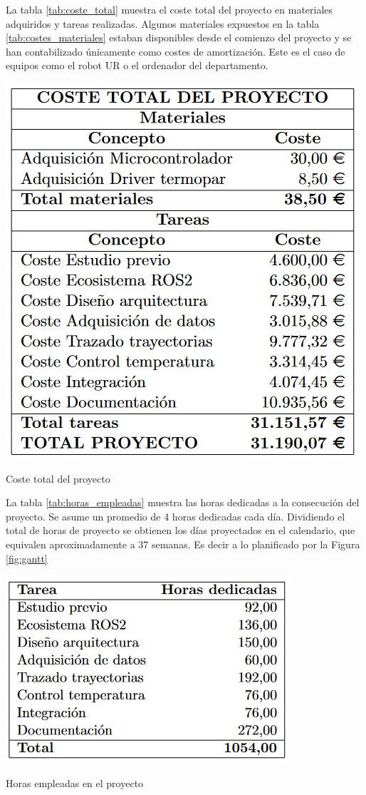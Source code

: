 La tabla \ref{tab:coste_total} muestra el coste total del proyecto en materiales adquiridos y tareas realizadas. Algunos materiales expuestos en la tabla \ref{tab:costes_materiales} estaban disponibles desde el comienzo del proyecto y se han contabilizado únicamente como costes de amortización. Este es el caso de equipos como el robot UR o el ordenador del departamento.

\begin{table}[h!]
    \centering
    \includegraphics[scale=0.35]{figuras/coste_total_tabla.png}
    \caption{Coste total del proyecto}
    \label{tab:coste_total}
\end{table}

La tabla \ref{tab:horas_empleadas} muestra las horas dedicadas a la consecución del proyecto. Se asume un promedio de 4 horas dedicadas cada día. Dividiendo el total de horas de proyecto se obtienen los días proyectados en el calendario, que equivalen aproximadamente a 37 semanas. Es decir a lo planificado por la Figura \ref{fig:gantt}

\begin{table}[h!]
    \centering
    \includegraphics[scale=0.5]{figuras/horas_empleadas_tabla.png}
    \caption{Horas empleadas en el proyecto}
    \label{tab:horas_empleadas}
\end{table}

